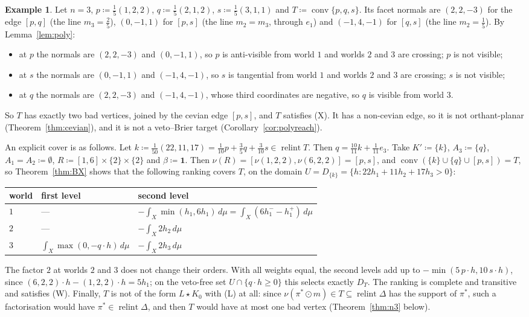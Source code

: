 \documentclass[11pt]{article}
\newcommand{\one}{\mathbf{1}}
\DeclareMathOperator{\conv}{conv}
\DeclareMathOperator{\relint}{relint}
\theoremstyle{plain}
\theoremstyle{definition}
\newtheorem{example}[theorem]{Example}
\theoremstyle{remark}
\begin{document}
\begin{example}\label{ex:T}
Let $n=3$, $p\coloneqq\frac15(1,2,2)$, $q\coloneqq\frac15(2,1,2)$, $s\coloneqq\frac15
(3,1,1)$ and $T\coloneqq\conv\{p,q,s\}$. Its facet normals are $(2,2,-3)$ for the edge
$[p,q]$ (the line $m_3=\frac25$), $(0,-1,1)$ for $[p,s]$ (the line $m_2=m_3$, through
$e_1$) and $(-1,4,-1)$ for $[q,s]$ (the line $m_2=\frac15$). By Lemma~\ref{lem:poly}:
\begin{itemize}
  \item at $p$ the normals are $(2,2,-3)$ and $(0,-1,1)$, so $p$ is anti-visible from
  world $1$ and worlds $2$ and $3$ are crossing; $p$ is not visible;
  \item at $s$ the normals are $(0,-1,1)$ and $(-1,4,-1)$, so $s$ is tangential from world
  $1$ and worlds $2$ and $3$ are crossing; $s$ is not visible;
  \item at $q$ the normals are $(2,2,-3)$ and $(-1,4,-1)$, whose third coordinates are
  negative, so $q$ is visible from world $3$.
\end{itemize}
So $T$ has exactly two bad vertices, joined by the cevian edge $[p,s]$, and $T$ satisfies
(X). It has a non-cevian edge, so it is not orthant-planar (Theorem~\ref{thm:cevian}), and
it is not a veto--Brier target (Corollary~\ref{cor:polyreach}).

An explicit cover is as follows. Let $k\coloneqq\frac1{50}(22,11,17)=\frac1{10}p+\frac35q+
\frac3{10}s\in\relint T$. Then $q=\frac{10}{11}k+\frac1{11}e_3$. Take $K'\coloneqq\{k\}$,
$A_3\coloneqq\{q\}$, $A_1=A_2\coloneqq\emptyset$, $R\coloneqq[1,6]\times\{2\}\times\{2\}$
and $\beta\coloneqq\one$. Then $\nu(R)=[\nu(1,2,2),\nu(6,2,2)]=[p,s]$, and
$\conv(\{k\}\cup\{q\}\cup[p,s])=T$, so Theorem~\ref{thm:BX} shows that the following
ranking covers $T$, on the domain $U=D_{\{k\}}=\{h:22h_1+11h_2+17h_3>0\}$:
\begin{center}
\begin{tabular}{lll}
\toprule
world & first level & second level\\
\midrule
$1$ & --- & $-\int_X\min(h_1,6h_1)\,d\mu=\int_X(6h_1^--h_1^+)\,d\mu$\\
$2$ & --- & $-\int_X2h_2\,d\mu$\\
$3$ & $\int_X\max(0,-q\cdot h)\,d\mu$ & $-\int_X2h_3\,d\mu$\\
\bottomrule
\end{tabular}
\end{center}
The factor $2$ at worlds $2$ and $3$ does not change their orders. With all weights equal,
the second levels add up to $-\min(5\,p\cdot h,10\,s\cdot h)$, since $(6,2,2)\cdot h-
(1,2,2)\cdot h=5h_1$; on the veto-free set $U\cap\{q\cdot h\ge0\}$ this selects exactly
$D_T$. The ranking is complete and transitive and satisfies (W). Finally, $T$ is not of the
form $L\star K_0$ with (L) at all: since $\nu(\pi^\ast\odot m)\in T\subseteq\relint\Delta$
has the support of $\pi^\ast$, such a factorisation would have $\pi^\ast\in\relint\Delta$,
and then $T$ would have at most one bad vertex (Theorem~\ref{thm:n3} below).
\end{example}
\end{document}
